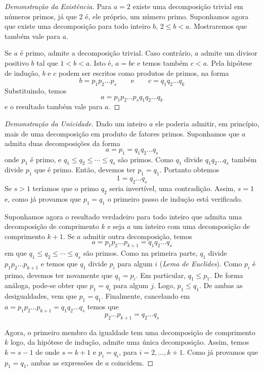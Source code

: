 \documentclass[fleqn]{profmat-cefet}
\begin{document}
\begin{proof}[Demonstração da Existência]
    Para $a=2$ existe uma decomposição trivial em números primos, já que 2 é, ele
    próprio, um número primo. Suponhamos agora que existe uma decomposição para
    todo inteiro $b$, $2\leq b<a$. Mostraremos que também vale para $a$. 
    
    Se $a$ é primo, admite a decomposição trivial. Caso contrário, $a$ admite um
    divisor positivo $b$ tal que $1<b<a$. Isto é, $a=bc$ e temos também $c<a$.
    Pela hipótese de indução, $b$ e $c$ podem ser escritos como produtos de
    primos, na forma
    \[ b=p_1 p_2 \dots p_s \qquad \text{e} \qquad c=q_1 q_2 \dots q_k \]
    Substituindo, temos 
    \[ a=p_1 p_2 \dots p_s q_1 q_2 \dots q_k \]
    e o resultado também vale para $a$.
\end{proof}

\begin{proof}[Demonstração da Unicidade]
    Dado um inteiro $a$ ele poderia admitir, em princípio, mais de uma
    decomposição em produto de fatores primos. Suponhamos que $a$ admita duas
    decomposições da forma 
    \[ a = p_1 = q_1 q_2 \dots q_s\]
    onde $p_1$ é primo, e $q_1 \leq q_2 \leq \cdots \leq q_s$ são primos. Como
    $q_1$ divide $q_1 q_2 \dots q_s$ também divide $p_1$ que é primo. Então,
    devemos ter $p_1=q_1$. Portanto obtemos
    \[ 1 = q_2 \dots q_s \]
    Se $s>1$ teríamos que o primo $q_2$ seria invertível, uma contradição. Assim,
    $s=1$ e, como já provamos que $p_1=q_1$ o primeiro passo de indução está
    verificado.
    
    Suponhamos agora o resultado verdadeiro para todo inteiro que admita uma
    decomposição de comprimento $k$ e seja $a$ um inteiro com uma decomposição de
    comprimento $k+1$. Se $a$ admitir outra decomposição, temos 
    \[ a = p_1 p_2 \dots  p_{k+1} = q_1 q_2 \dots q_s\]
    em que  $q_1 \leq q_2 \leq \cdots \leq q_s$ são primos. Como na primeira
    parte, $q_1$ divide $p_1 p_2 \dots p_{k+1}$ e temos que $q_1$ divide $p_i$
    para algum $i$ (\textit{Lema de Euclides}). Como $p_i$ é primo, devemos ter
    novamente que $q_1=p_i$. Em particular, $q_1 \leq p_1$. De forma análoga,
    pode-se obter que $p_1=q_i$ para algum $j$. Logo, $p_1 \leq q_1$. De ambas as
    desigualdades, vem que $p_1=q_1$. Finalmente, cancelando em 
    ${a = p_1 p_2 \dots p_{k+1} = q_1 q_2 \dots q_s}$
    temos que 
    \[ p_2 \dots p_{k+1} = q_2 \dots q_s\]
    
    Agora, o primeiro membro da igualdade tem uma decomposição de comprimento $k$
    logo, da hipótese de indução, admite uma única decomposição. Assim, temos
    $k=s-1$ de onde $s=k+1$ e $p_i=q_i$, para $i=2,\dots,k+1$. Como já provamos
    que $p_1=q_1$, ambas as expressões de $a$ coincidem. 
\end{proof}
\end{document}
